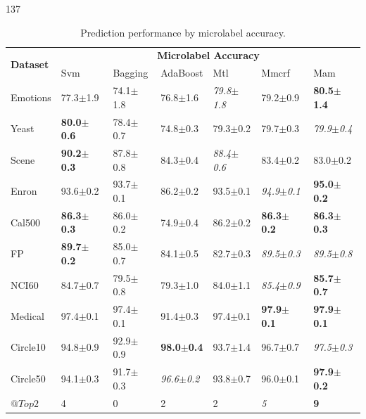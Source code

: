 \documentclass[a4poster]{article}
\begin{document}
\begin{textblock}{137}
	\begin{multicols}{2}
	\begin{table}
		\small
		\caption{Prediction performance by microlabel accuracy.}
			\vspace{-5mm}
		\label{prediction_performance_1}
		\begin{center}
		\begin{tiny}
		\begin{sc}
		\begin{tabular}{|p{0.65cm}|p{0.52cm}|p{0.55cm}|p{0.68cm}|p{0.52cm}|p{0.55cm}|p{0.52cm}|} \hline
			\multirow{2}{*}{\textbf{Dataset}} 
			& \multicolumn{6}{c|}{\textbf{Microlabel Accuracy}} \\ \cline{2-7} 
		    & Svm & Bagging & AdaBoost & Mtl & Mmcrf & Mam\\ \cline{1-7}
			Emotions & {77.3}$\pm${1.9} & {74.1}$\pm${1.8} & {76.8}$\pm${1.6} & \em{79.8}$\pm${1.8} & {79.2}$\pm${0.9} & \bf{80.5}$\pm${1.4} \\ \hline
			Yeast & \bf{80.0}$\pm${0.6} & {78.4}$\pm${0.7} & {74.8}$\pm${0.3} & {79.3}$\pm${0.2} & {79.7}$\pm${0.3} & \em{79.9}$\pm${0.4} \\ \hline
			Scene & \bf{90.2}$\pm${0.3} & {87.8}$\pm${0.8} & {84.3}$\pm${0.4} & \em{88.4}$\pm${0.6} & {83.4}$\pm${0.2} & {83.0}$\pm${0.2} \\ \hline
			Enron & {93.6}$\pm${0.2} & {93.7}$\pm${0.1} & {86.2}$\pm${0.2} & {93.5}$\pm${0.1} & \em{94.9}$\pm${0.1} & \bf{95.0}$\pm${0.2} \\ \hline
			Cal500 & \bf{86.3}$\pm${0.3} & {86.0}$\pm${0.2} & {74.9}$\pm${0.4} & {86.2}$\pm${0.2} & \bf{86.3}$\pm${0.2} & \bf{86.3}$\pm${0.3} \\ \hline
			FP & \bf{89.7}$\pm${0.2} & {85.0}$\pm${0.7} & {84.1}$\pm${0.5} & {82.7}$\pm${0.3} & \em{89.5}$\pm${0.3} & \em{89.5}$\pm${0.8} \\ \hline
			NCI60 & {84.7}$\pm${0.7} & {79.5}$\pm${0.8} & {79.3}$\pm${1.0} & {84.0}$\pm${1.1} & \em{85.4}$\pm${0.9} & \bf{85.7}$\pm${0.7} \\ \hline
			Medical & {97.4}$\pm${0.1} & {97.4}$\pm${0.1} & {91.4}$\pm${0.3} & {97.4}$\pm${0.1} & \bf{97.9}$\pm${0.1} & \bf{97.9}$\pm${0.1} \\ \hline
			Circle10 & {94.8}$\pm${0.9} & {92.9}$\pm${0.9} & \bf{98.0}$\pm${0.4} & {93.7}$\pm${1.4} & {96.7}$\pm${0.7} & \em{97.5}$\pm${0.3} \\ \hline
			Circle50 & {94.1}$\pm${0.3} & {91.7}$\pm${0.3} & \em{96.6}$\pm${0.2} & {93.8}$\pm${0.7} & {96.0}$\pm${0.1} & \bf{97.9}$\pm${0.2} \\ \hline
			$@Top2$ & {4} & {0} & {2} & {2} & \em{5} & \bf{9} \\ \hline
		\end{tabular}
		\end{sc}
		\end{tiny}
		\end{center}
	\end{table}	



\end{multicols}
\end{textblock}
\end{document}
